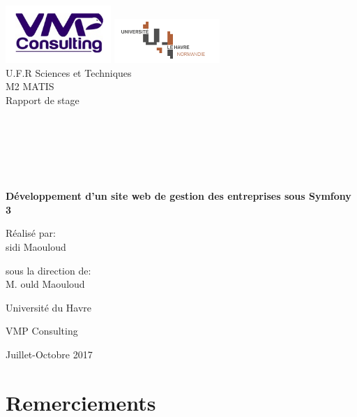 \documentclass[12pt]{article}
\begin{document}
\begin{titlepage}
\begin{center}

\hfill
\vfill
\bigskip
\huge{ \includegraphics[width=0.3\textwidth]{logo.png} 
\includegraphics[width=0.3\textwidth]{lh.png} \\
U.F.R Sciences et Techniques \\
M2 MATIS  \\
 Rapport de stage \\  \\ \\ \\ \\
 } 
\vfill
\bigskip 
\Huge 
\bigskip %
\\ \\
\textbf{ Développement d'un site web de gestion des entreprises sous Symfony 3 } \par 
\vfill

\Large \begin{flushleft}
 Réalisé par:\\ sidi Maouloud \par
\end{flushleft}
		 
		  \begin{flushright}
		                    sous la direction de:\\  M. ould Maouloud
		                   \end{flushright}



		 
\vfill
\Large Université du Havre \par \Large VMP Consulting		
		\bigskip 
\bigskip

\Large
Juillet-Octobre 2017
\end{center}
\end{titlepage}

\section*{Remerciements}
\end{document}
